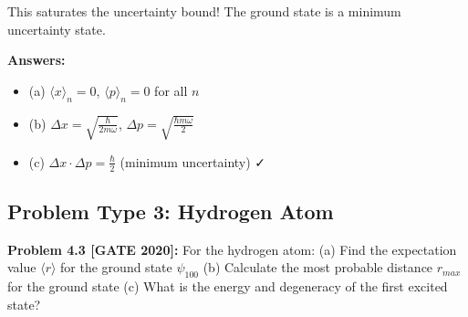 \documentclass[12pt,a4paper]{article}
\begin{document}
\begin{solution}
This saturates the uncertainty bound! The ground state is a minimum uncertainty state.

\textbf{Answers:}
\begin{itemize}
    \item (a) $\langle x \rangle_n = 0$, $\langle p \rangle_n = 0$ for all $n$
    \item (b) $\Delta x = \sqrt{\frac{\hbar}{2m\omega}}$, $\Delta p = \sqrt{\frac{\hbar m\omega}{2}}$
    \item (c) $\Delta x \cdot \Delta p = \frac{\hbar}{2}$ (minimum uncertainty) ✓
\end{itemize}
\end{solution}

\subsection{Problem Type 3: Hydrogen Atom}

\textbf{Problem 4.3 [GATE 2020]:} For the hydrogen atom:
(a) Find the expectation value $\langle r \rangle$ for the ground state $\psi_{100}$
(b) Calculate the most probable distance $r_{max}$ for the ground state
(c) What is the energy and degeneracy of the first excited state?
\end{document}
